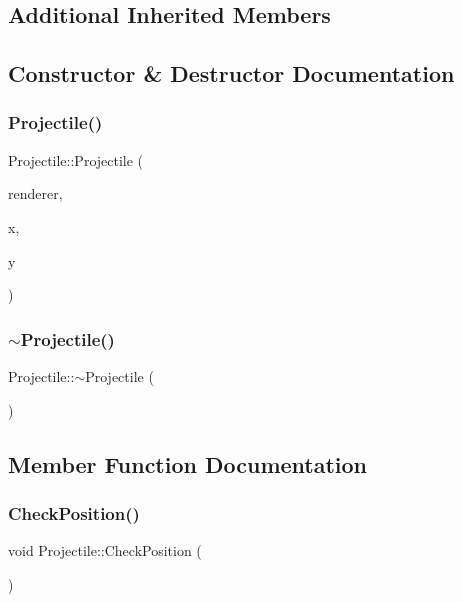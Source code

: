 \subsection*{Additional Inherited Members}


\subsection{Constructor \& Destructor Documentation}
\mbox{\label{class_projectile_a0906140caebe54c0b087c7e6240f3084}} 
\subsubsection{\texorpdfstring{Projectile()}{Projectile()}}
{\footnotesize\ttfamily Projectile\+::\+Projectile (\begin{DoxyParamCaption}\item[{S\+D\+L\+\_\+\+Renderer $\ast$}]{renderer,  }\item[{int}]{x,  }\item[{int}]{y }\end{DoxyParamCaption})}

\mbox{\label{class_projectile_a94903e021fa2edab60ba3836ca0b937d}} 
\subsubsection{\texorpdfstring{$\sim$\+Projectile()}{~Projectile()}}
{\footnotesize\ttfamily Projectile\+::$\sim$\+Projectile (\begin{DoxyParamCaption}{ }\end{DoxyParamCaption})}



\subsection{Member Function Documentation}
\mbox{\label{class_projectile_a6baf0fc9681b7c13b64a1c82671e296f}} 
\subsubsection{\texorpdfstring{Check\+Position()}{CheckPosition()}}
{\footnotesize\ttfamily void Projectile\+::\+Check\+Position (\begin{DoxyParamCaption}{ }\end{DoxyParamCaption})\hspace{0.3cm}{\ttfamily [protected]}}

